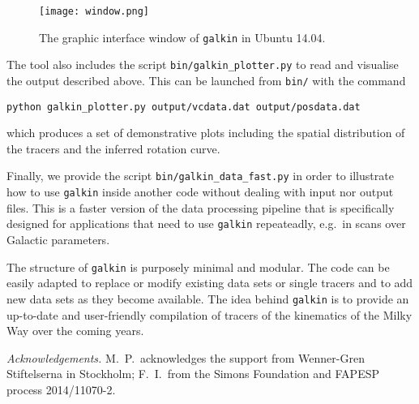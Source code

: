 \documentclass[twocolumn,prd,reprint,preprintnumbers,amsmath,amssymb,superscriptaddress,nofootinbib]{revtex4}
\begin{document}
\begin{figure}[tp]
\centering
\texttt{[image: window.png]}
\caption{The graphic interface window of \texttt{galkin} in Ubuntu 14.04.}
\label{fig:interface}  
\end{figure}


\par The tool also includes the script \texttt{bin/galkin\_plotter.py} to read and visualise the output described above. This can be launched from \texttt{bin/} with the command
\vspace{0.1cm}
\par \texttt{python galkin\_plotter.py output/vcdata.dat output/posdata.dat}
\vspace{0.15cm}
\par \hspace{-0.5cm}
which produces a set of demonstrative plots including the spatial distribution of the tracers and the inferred rotation curve.

Finally, we provide the script \texttt{bin/galkin\_data\_fast.py} in order to illustrate how to use \texttt{galkin} inside another code without dealing with input nor output files. This is a faster version of the data processing pipeline that is specifically designed for applications that need to use \texttt{galkin} repeateadly, e.g.~in scans over Galactic parameters.

\par The structure of \texttt{galkin} is purposely minimal and modular. The code can be easily adapted to replace or modify existing data sets or single tracers and to add new data sets as they become available. The idea behind \texttt{galkin} is to provide an up-to-date and user-friendly compilation of tracers of the kinematics of the Milky Way over the coming years.








\vspace{0.5cm}
{\it Acknowledgements.} M.~P.~acknowledges the support from Wenner-Gren Stiftelserna in Stockholm; F.~I.~from the Simons Foundation and FAPESP process 2014/11070-2.




\appendix*
\end{document}
